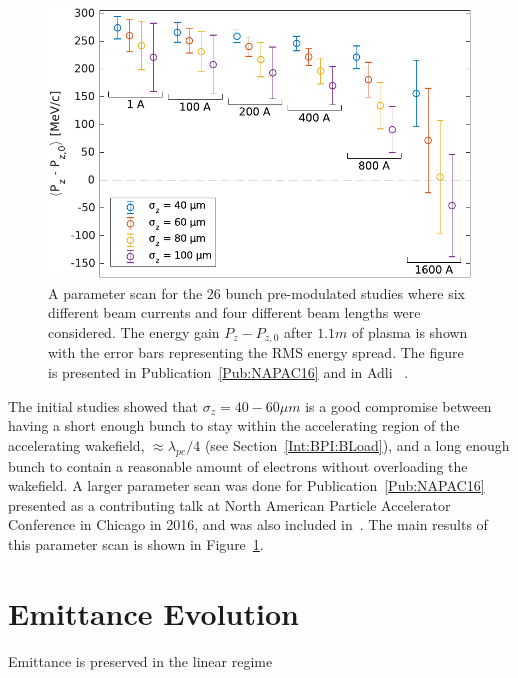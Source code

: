 \begin{figure}[hbt]
    \centering
    \includegraphics[width=0.625\linewidth]{figures/NAPACEGainSpreadScan}
    \caption{\label{Fig:SimA:BLoadScan}
        A parameter scan for the 26 bunch pre-modulated studies where six different beam currents and four different beam lengths were considered.
        The energy gain $P_{z} - P_{z,0}$ after $1.1\unit{m}$ of plasma is shown with the error bars representing the RMS energy spread.
        The figure is presented in Publication~\ref{Pub:NAPAC16} and in Adli \etal~\cite{adli:2016a}.
    }
\end{figure}

The initial studies showed that $\sigma_{z} = 40-60\unit{\mu m}$ is a good compromise between having a short enough bunch to stay within the accelerating region of the accelerating wakefield, $\approx \lambda_{pe}/4$ (see Section~\ref{Int:BPI:BLoad}), and a long enough bunch to contain a reasonable amount of electrons without overloading the wakefield.
A larger parameter scan was done for Publication~\ref{Pub:NAPAC16} presented as a contributing talk at North American Particle Accelerator Conference in Chicago in 2016, and was also included in~\cite{adli:2016a}.
The main results of this parameter scan is shown in Figure~\ref{Fig:SimA:BLoadScan}.

\section{Emittance Evolution}
\label{SimA:Emitt}

Emittance is preserved in the linear regime

